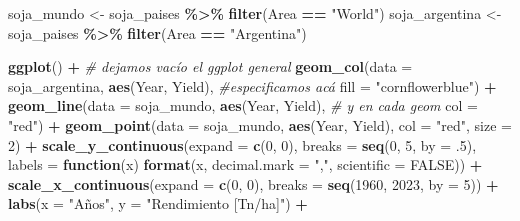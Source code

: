 \documentclass[
]{article}
\newenvironment{Shaded}{\begin{snugshade}}{\end{snugshade}}
\newcommand{\AttributeTok}[1]{\textcolor[rgb]{0.13,0.29,0.53}{#1}}
\newcommand{\CommentTok}[1]{\textcolor[rgb]{0.56,0.35,0.01}{\textit{#1}}}
\newcommand{\ConstantTok}[1]{\textcolor[rgb]{0.56,0.35,0.01}{#1}}
\newcommand{\ControlFlowTok}[1]{\textcolor[rgb]{0.13,0.29,0.53}{\textbf{#1}}}
\newcommand{\DecValTok}[1]{\textcolor[rgb]{0.00,0.00,0.81}{#1}}
\newcommand{\FunctionTok}[1]{\textcolor[rgb]{0.13,0.29,0.53}{\textbf{#1}}}
\newcommand{\NormalTok}[1]{#1}
\newcommand{\OtherTok}[1]{\textcolor[rgb]{0.56,0.35,0.01}{#1}}
\newcommand{\SpecialCharTok}[1]{\textcolor[rgb]{0.81,0.36,0.00}{\textbf{#1}}}
\newcommand{\StringTok}[1]{\textcolor[rgb]{0.31,0.60,0.02}{#1}}
\begin{document}
\begin{Shaded}
\begin{Highlighting}[]
\NormalTok{soja\_mundo    }\OtherTok{\textless{}{-}}\NormalTok{ soja\_paises }\SpecialCharTok{\%\textgreater{}\%} \FunctionTok{filter}\NormalTok{(Area }\SpecialCharTok{==} \StringTok{"World"}\NormalTok{)}
\NormalTok{soja\_argentina }\OtherTok{\textless{}{-}}\NormalTok{ soja\_paises }\SpecialCharTok{\%\textgreater{}\%} \FunctionTok{filter}\NormalTok{(Area }\SpecialCharTok{==} \StringTok{"Argentina"}\NormalTok{)}

\FunctionTok{ggplot}\NormalTok{() }\SpecialCharTok{+} \CommentTok{\# dejamos vacío el ggplot general}
  \FunctionTok{geom\_col}\NormalTok{(}\AttributeTok{data  =}\NormalTok{ soja\_argentina, }
           \FunctionTok{aes}\NormalTok{(Year, Yield), }\CommentTok{\#especificamos acá}
           \AttributeTok{fill =} \StringTok{"cornflowerblue"}\NormalTok{) }\SpecialCharTok{+}
  \FunctionTok{geom\_line}\NormalTok{(}\AttributeTok{data  =}\NormalTok{ soja\_mundo, }
            \FunctionTok{aes}\NormalTok{(Year, Yield), }\CommentTok{\# y en cada geom}
            \AttributeTok{col =} \StringTok{"red"}\NormalTok{) }\SpecialCharTok{+}
  \FunctionTok{geom\_point}\NormalTok{(}\AttributeTok{data =}\NormalTok{ soja\_mundo, }
             \FunctionTok{aes}\NormalTok{(Year, Yield), }
             \AttributeTok{col =} \StringTok{"red"}\NormalTok{, }\AttributeTok{size =} \DecValTok{2}\NormalTok{) }\SpecialCharTok{+}
  \FunctionTok{scale\_y\_continuous}\NormalTok{(}\AttributeTok{expand =} \FunctionTok{c}\NormalTok{(}\DecValTok{0}\NormalTok{, }\DecValTok{0}\NormalTok{), }\AttributeTok{breaks =} \FunctionTok{seq}\NormalTok{(}\DecValTok{0}\NormalTok{, }\DecValTok{5}\NormalTok{, }\AttributeTok{by =}\NormalTok{ .}\DecValTok{5}\NormalTok{),}
                     \AttributeTok{labels =} \ControlFlowTok{function}\NormalTok{(x) }\FunctionTok{format}\NormalTok{(x, }\AttributeTok{decimal.mark =} \StringTok{","}\NormalTok{,}
                                                 \AttributeTok{scientific =} \ConstantTok{FALSE}\NormalTok{)) }\SpecialCharTok{+}
  \FunctionTok{scale\_x\_continuous}\NormalTok{(}\AttributeTok{expand =} \FunctionTok{c}\NormalTok{(}\DecValTok{0}\NormalTok{, }\DecValTok{0}\NormalTok{), }\AttributeTok{breaks =} \FunctionTok{seq}\NormalTok{(}\DecValTok{1960}\NormalTok{, }\DecValTok{2023}\NormalTok{, }\AttributeTok{by =} \DecValTok{5}\NormalTok{)) }\SpecialCharTok{+}
  \FunctionTok{labs}\NormalTok{(}\AttributeTok{x =} \StringTok{"Años"}\NormalTok{,}
       \AttributeTok{y =} \StringTok{"Rendimiento [Tn/ha]"}\NormalTok{) }\SpecialCharTok{+}

\end{Highlighting}
\end{Shaded}
\end{document}
